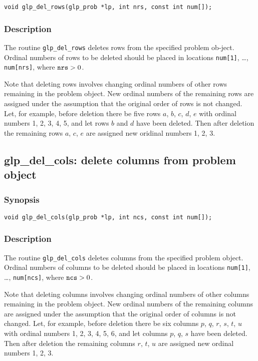 \begin{verbatim}
void glp_del_rows(glp_prob *lp, int nrs, const int num[]);
\end{verbatim}

\subsubsection*{Description}

The routine \verb|glp_del_rows| deletes rows from the specified problem
ob-\linebreak ject. Ordinal numbers of rows to be deleted should be
placed in locations \verb|num[1]|, \dots, \verb|num[nrs]|, where
${\tt nrs}>0$.

Note that deleting rows involves changing ordinal numbers of other
rows remaining in the problem object. New ordinal numbers of the
remaining rows are assigned under the assumption that the original
order of rows is not changed. Let, for example, before deletion there
be five rows $a$, $b$, $c$, $d$, $e$ with ordinal numbers 1, 2, 3, 4, 5,
and let rows $b$ and $d$ have been deleted. Then after deletion the
remaining rows $a$, $c$, $e$ are assigned new oridinal numbers 1, 2, 3.

\subsection{glp\_del\_cols: delete columns from problem object}

\subsubsection*{Synopsis}

\begin{verbatim}
void glp_del_cols(glp_prob *lp, int ncs, const int num[]);
\end{verbatim}

\subsubsection*{Description}

The routine \verb|glp_del_cols| deletes columns from the specified
problem object. Ordinal numbers of columns to be deleted should be
placed in locations \verb|num[1]|, \dots, \verb|num[ncs]|, where
${\tt ncs}>0$.

Note that deleting columns involves changing ordinal numbers of other
columns remaining in the problem object. New ordinal numbers of the
remaining columns are assigned under the assumption that the original
order of columns is not changed. Let, for example, before deletion there
be six columns $p$, $q$, $r$, $s$, $t$, $u$ with ordinal numbers 1, 2,
3, 4, 5, 6, and let columns $p$, $q$, $s$ have been deleted. Then after
deletion the remaining columns $r$, $t$, $u$ are assigned new ordinal
numbers 1, 2, 3.

